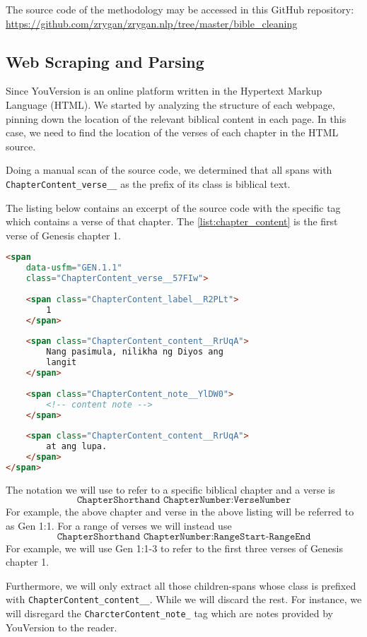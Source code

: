 \documentclass{article}
\begin{document}
The source code of the methodology may be accessed in this GitHub repository:
\url{https://github.com/zrygan/zrygan.nlp/tree/master/bible_cleaning}

\subsection{Web Scraping and Parsing}

Since YouVersion is an online platform written in the Hypertext Markup Language
(HTML). We started by analyzing the structure of each webpage, pinning down the
location of the relevant biblical content in each page. In this case, we need
to find the location of the verses of each chapter in the HTML source.

Doing a manual scan of the source code, we determined that all spans with
\texttt{ChapterContent\_verse\_\_} as the prefix of its class is biblical text.

The listing below contains an excerpt of the source code with the specific tag
which contains a verse of that chapter. The \cref{list:chapter_content} is the
first verse of Genesis chapter 1.

\begin{lstlisting}[language=HTML, caption={\texttt{ChapterContent\_verse\_\_} tag}, label={list:chapter_content}]
<span 
    data-usfm="GEN.1.1"
    class="ChapterContent_verse__57FIw">
    
    <span class="ChapterContent_label__R2PLt">
        1
    </span>
    
    <span class="ChapterContent_content__RrUqA">
        Nang pasimula, nilikha ng Diyos ang
        langit
    </span>
    
    <span class="ChapterContent_note__YlDW0">
        <!-- content note -->
    </span>
    
    <span class="ChapterContent_content__RrUqA">
        at ang lupa.
    </span>
</span>
\end{lstlisting}

The notation we will use to refer to a specific biblical chapter and a verse is
\[\texttt{ChapterShorthand ChapterNumber:VerseNumber}\]
For example, the above chapter and verse in the above listing will be referred
to as Gen 1:1. For a range of verses we will instead use
\[\texttt{ChapterShorthand ChapterNumber:RangeStart-RangeEnd}\]
For example, we will use Gen 1:1-3 to refer to the first three verses of
Genesis chapter 1.

Furthermore, we will only extract all those children-spans whose class is
prefixed with \texttt{ChapterContent\_content\_\_}. While we will discard the
rest. For instance, we will disregard the \texttt{CharcterContent\_note\_} tag
which are notes provided by YouVersion to the reader.
\end{document}
